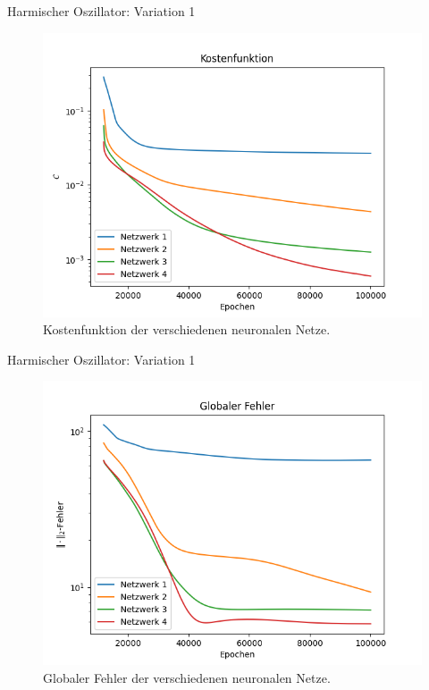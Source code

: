 \begin{frame}{Harmischer Oszillator: Variation 1}
    \begin{figure}
        \centering
        \includegraphics[scale=0.5]{images/harmonicoscillator_plots/harmonicoscillatorML_error__neurons_var_avrloss}
        \caption{Kostenfunktion der verschiedenen neuronalen Netze.}
        \label{fig:harmonic-neurons-variable-loss}
    \end{figure}
\end{frame}

\begin{frame}{Harmischer Oszillator: Variation 1}
    \begin{figure}
        \centering
        \includegraphics[scale=0.5]{images/harmonicoscillator_plots/harmonicoscillatorML_error__neurons_var_error}
        \caption{Globaler Fehler der verschiedenen neuronalen Netze.}
        \label{fig:harmonic-neurons-variable-error}
    \end{figure}
\end{frame}

